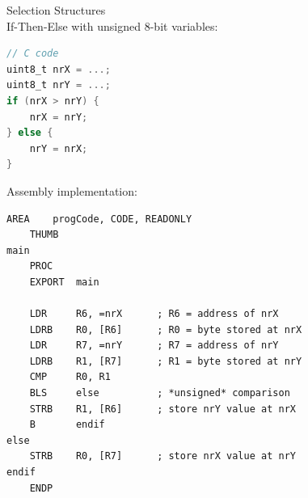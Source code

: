 \begin{example2}{Selection Structures}\\
If-Then-Else with unsigned 8-bit variables:

\begin{lstlisting}[language=C, style=basesmol]
// C code
uint8_t nrX = ...;
uint8_t nrY = ...;
if (nrX > nrY) {
    nrX = nrY;
} else {
    nrY = nrX;
}
\end{lstlisting}

Assembly implementation:
\begin{lstlisting}[language=armasm, style=basesmol]
    AREA    progCode, CODE, READONLY
    THUMB
main
    PROC
    EXPORT  main
    
    LDR     R6, =nrX      ; R6 = address of nrX
    LDRB    R0, [R6]      ; R0 = byte stored at nrX
    LDR     R7, =nrY      ; R7 = address of nrY
    LDRB    R1, [R7]      ; R1 = byte stored at nrY
    CMP     R0, R1
    BLS     else          ; *unsigned* comparison
    STRB    R1, [R6]      ; store nrY value at nrX
    B       endif
else
    STRB    R0, [R7]      ; store nrX value at nrY
endif
    ENDP
\end{lstlisting}
\end{example2}

